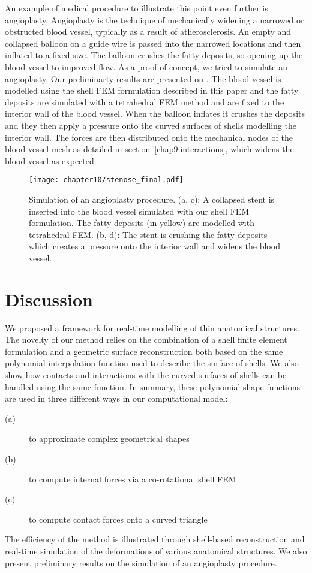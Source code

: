 An example of medical procedure to illustrate this point even further is angioplasty. Angioplasty is the technique of mechanically widening a narrowed or obstructed blood vessel, typically as a result of atherosclerosis. An empty and collapsed balloon on a guide wire is passed into the narrowed locations and then inflated to a fixed size. The balloon crushes the fatty deposits, so opening up the blood vessel to improved flow. As a proof of concept, we tried to simulate an angioplasty. Our preliminarty results are presented on . The blood vessel is modelled using the shell FEM formulation described in this paper and the fatty deposits are simulated with a tetrahedral FEM method and are fixed to the interior wall of the blood vessel. When the balloon inflates it crushes the deposits and they then apply a pressure onto the curved surfaces of shells modelling the interior wall. The forces are then distributed onto the mechanical nodes of the blood vessel mesh as detailed in section~\ref{chap9:interactions}, which widens the blood vessel as expected. 
%
\begin{figure}
\centering
\texttt{[image: chapter10/stenose\_final.pdf]}
\caption {Simulation of an angioplasty procedure. (a, c): A collapsed stent is inserted into the blood vessel simulated with our shell FEM formulation. The fatty deposits (in yellow) are modelled with tetrahedral FEM. (b, d): The stent is crushing the fatty deposits which creates a pressure onto the interior wall and widens the blood vessel.}
\label{chap10:fig-stent}
\end{figure}

\section{Discussion}

We proposed a framework for real-time modelling of thin anatomical structures. The novelty of our method relies on the combination of a shell finite element formulation and a geometric surface reconstruction both based on the same polynomial interpolation function used to describe the surface of shells. We also show how contacts and interactions with the curved surfaces of shells can be handled using the same function. In summary, these polynomial shape functions are used in three different ways in our computational model:
%
\begin{description}
\item[(a)] to approximate complex geometrical shapes
\item[(b)] to compute internal forces via a co-rotational shell FEM
\item[(c)] to compute contact forces onto a curved triangle
\end{description}

The efficiency of the method is illustrated through shell-based reconstruction and real-time simulation of the deformations of various anatomical structures. We also present preliminary results on the simulation of an angioplasty procedure. 

\bigskip

